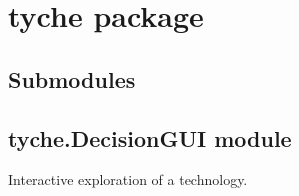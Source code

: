 \documentclass[letterpaper,10pt,english]{sphinxmanual}
\begin{document}
\section{tyche package}
\label{\detokenize{tyche:tyche-package}}\label{\detokenize{tyche::doc}}

\subsection{Submodules}
\label{\detokenize{tyche:submodules}}

\subsection{tyche.DecisionGUI module}
\label{\detokenize{tyche:module-tyche.DecisionGUI}}\label{\detokenize{tyche:tyche-decisiongui-module}}
Interactive exploration of a technology.
\end{document}
